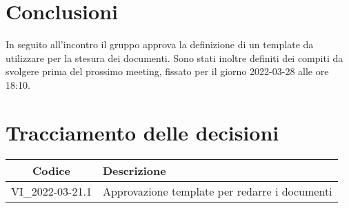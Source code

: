     \section{Conclusioni}
            In seguito all'incontro il gruppo approva la definizione di un template da utilizzare per la stesura dei documenti. Sono stati inoltre definiti dei compiti da svolgere prima del prossimo meeting, fissato per il giorno 2022-03-28 alle ore 18:10. 
        \newpage
        
        \section*{Tracciamento delle decisioni}
        \renewcommand{\arraystretch}{1.8} %
        \begin{tabular}{ |c|l| }
            \hline
            \textbf{Codice} & \textbf{Descrizione} \\
            \hline
            VI\_2022-03-21.1 & Approvazione template per redarre i documenti \\ \hline
        \end{tabular}